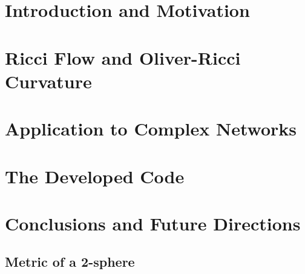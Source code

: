 \documentclass[a4paper,12pt,twoside,customfont,custombib,PageStyleI]{Settings/PhDThesisPSnPDF}
\begin{document}
\chapter{Introduction and Motivation}\label{chap:chapter2}





\chapter{Ricci Flow and Oliver-Ricci Curvature}\label{chap:chapter3}




\chapter{Application to Complex Networks}\label{chap:chapter4}




\chapter{The Developed Code}\label{chap:chapter5}





\chapter{Conclusions and Future Directions}\label{chap:chapter6}


\begin{appendices} %
\chapter{Metric of a 2-sphere}

\end{appendices}

\backmatter

\begin{spacing}{0.9}

\cleardoublepage
\nocite{*}
\printbibliography[heading=bibintoc, title={References}]

\end{spacing}

\end{document}
